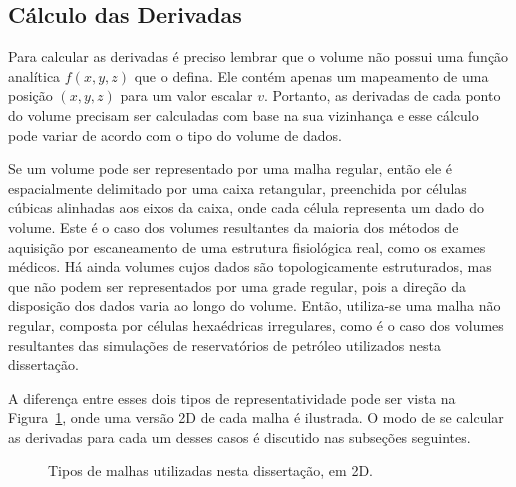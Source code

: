 \subsection{Cálculo das Derivadas}
	Para calcular as derivadas é preciso lembrar que o volume não possui uma função analítica $ f(x, y, z) $ que o defina. Ele contém apenas um mapeamento de uma posição $ (x, y, z) $ para um valor escalar $ v $. Portanto, as derivadas de cada ponto do volume precisam ser calculadas com base na sua vizinhança e esse cálculo pode variar de acordo com o tipo do volume de dados.
	
	Se um volume pode ser representado por uma malha regular, então ele é espacialmente delimitado por uma caixa retangular, preenchida por células cúbicas alinhadas aos eixos da caixa, onde cada célula representa um dado do volume. Este é o caso dos volumes resultantes da maioria dos métodos de aquisição por escaneamento de uma estrutura fisiológica real, como os exames médicos. Há ainda volumes cujos dados são topologicamente estruturados, mas que não podem ser representados por uma grade regular, pois a direção da disposição dos dados varia ao longo do volume. Então, utiliza-se uma malha não regular, composta por células hexaédricas irregulares, como é o caso dos volumes resultantes das simulações de reservatórios de petróleo utilizados nesta dissertação.
	
	A diferença entre esses dois tipos de representatividade pode ser vista na Figura~\ref{fig:meshes}, onde uma versão 2D de cada malha é ilustrada. O modo de se calcular as derivadas para cada um desses casos é discutido nas subseções seguintes.
	
\begin{figure}[h]
	\centering
	\hspace{10mm}
	\caption{Tipos de malhas utilizadas nesta dissertação, em 2D.}
	\label{fig:meshes}
\end{figure}
    
